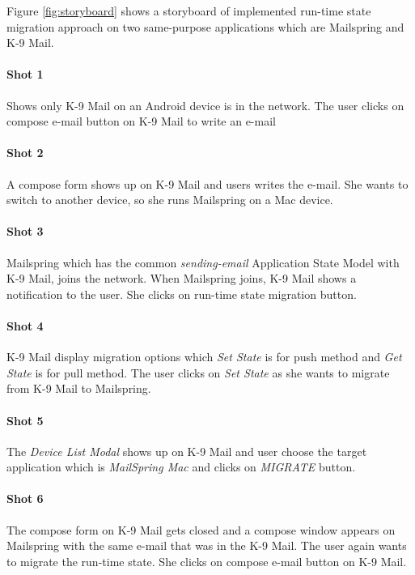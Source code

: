 Figure \ref{fig:storyboard} shows a storyboard of implemented run-time state migration approach on two same-purpose applications which are Mailspring and K-9 Mail.

\paragraph{Shot 1}
Shows only K-9 Mail on an Android device is in the network. The user clicks on compose e-mail button on K-9 Mail to write an e-mail

\paragraph{Shot 2}
A compose form shows up on K-9 Mail and users writes the e-mail. She wants to switch to another device, so she runs Mailspring on a Mac device.

\paragraph{Shot 3}
Mailspring which has the common \textit{sending-email} Application State Model with K-9 Mail, joins the network. When Mailspring joins, K-9 Mail shows a notification to the user. She clicks on run-time state migration button.

\paragraph{Shot 4}
K-9 Mail display migration options which \textit{Set State} is for push method and \textit{Get State} is for pull method. The user clicks on \textit{Set State} as she wants to migrate from K-9 Mail to Mailspring.

\paragraph{Shot 5}
The \textit{Device List Modal} shows up on K-9 Mail and user choose the target application which is \textit{MailSpring Mac} and clicks on \textit{MIGRATE} button.

\paragraph{Shot 6}
The compose form on K-9 Mail gets closed and a compose window appears on Mailspring with the same e-mail that was in the K-9 Mail. The user again wants to migrate the run-time state. She clicks on compose e-mail button on K-9 Mail.

